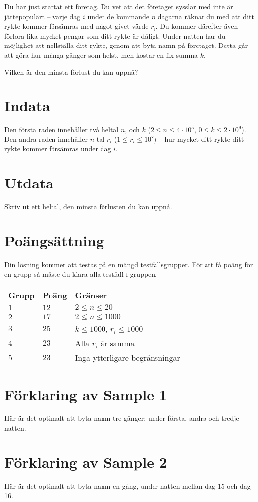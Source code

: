 Du har just startat ett företag.
Du vet att det företaget sysslar med inte är jättepopulärt --
varje dag $i$ under de kommande $n$ dagarna räknar du med att ditt rykte kommer försämras med något givet värde $r_i$.
Du kommer därefter även förlora lika mycket pengar som ditt rykte är dåligt.
Under natten har du möjlighet att nollställa ditt rykte, genom att byta namn på företaget.
Detta går att göra hur många gånger som helst, men kostar en fix summa $k$.

Vilken är den minsta förlust du kan uppnå?

\section*{Indata}
Den första raden innehåller två heltal $n$, och $k$ ($2 \leq n \leq 4 \cdot 10^5$, $0 \leq k \leq 2 \cdot 10^9$).
Den andra raden innehåller $n$ tal $r_i$ ($1 \le r_i \le 10^7$) -- hur mycket ditt rykte ditt rykte kommer försämras under dag $i$.

\section*{Utdata}
Skriv ut ett heltal, den minsta förlusten du kan uppnå.

\section*{Poängsättning}
Din lösning kommer att testas på en mängd testfallsgrupper. För att få poäng för en grupp så måste du klara alla testfall i gruppen.

\noindent
\begin{tabular}{| l | l | p{12cm} |}
  \hline
  \textbf{Grupp} & \textbf{Poäng} & \textbf{Gränser} \\ \hline
  $1$    & $12$      & $2 \le n \le 20$ \\ \hline
  $2$    & $17$      & $2 \le n \le 1000$ \\ \hline
  $3$    & $25$      & $k \le 1000$, $r_i \le 1000$  \\ \hline
  $4$    & $23$      & Alla $r_i$ är samma \\ \hline
  $5$    & $23$      & Inga ytterligare begränsningar \\ \hline
\end{tabular}

\section*{Förklaring av Sample 1}
Här är det optimalt att byta namn tre gånger: under första, andra och tredje natten.

\section*{Förklaring av Sample 2}
Här är det optimalt att byta namn en gång, under natten mellan dag 15 och dag 16.
